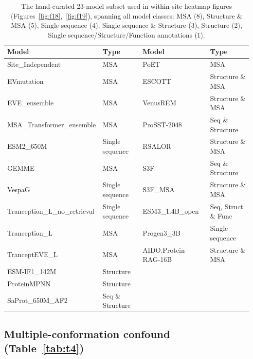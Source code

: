 \documentclass{article}
\begin{document}
\begin{table}[h]
  \caption{The hand-curated 23-model subset used in within-site heatmap figures (Figures~\ref{fig:f18},~\ref{fig:f19}), spanning all model classes: MSA (8), Structure \& MSA (5), Single sequence (4), Single sequence \& Structure (3), Structure (2), Single sequence/Structure/Function annotations (1).}
  \label{tab:t3}
  \centering
  \footnotesize
  \begin{tabular}{llll}
    \toprule
    Model & Type & Model & Type \\
    \midrule
    Site\_Independent & MSA & PoET & MSA \\
    EVmutation & MSA & ESCOTT & Structure \& MSA \\
    EVE\_ensemble & MSA & VenusREM & Structure \& MSA \\
    MSA\_Transformer\_ensemble & MSA & ProSST-2048 & Seq \& Structure \\
    ESM2\_650M & Single sequence & RSALOR & Structure \& MSA \\
    GEMME & MSA & S3F & Seq \& Structure \\
    VespaG & Single sequence & S3F\_MSA & Structure \& MSA \\
    Tranception\_L\_no\_retrieval & Single sequence & ESM3\_1.4B\_open & Seq, Struct \& Func \\
    Tranception\_L & MSA & Progen3\_3B & Single sequence \\
    TranceptEVE\_L & MSA & AIDO.Protein-RAG-16B & Structure \& MSA \\
    ESM-IF1\_142M & Structure & & \\
    ProteinMPNN & Structure & & \\
    SaProt\_650M\_AF2 & Seq \& Structure & & \\
    \bottomrule
  \end{tabular}
\end{table}
\FloatBarrier

\subsection{Multiple-conformation confound (Table~\ref{tab:t4})}
\end{document}
